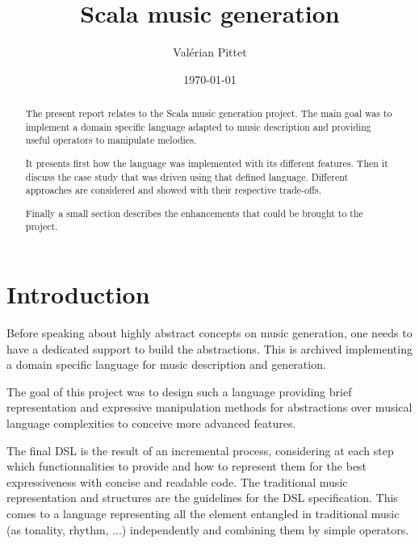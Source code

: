 \documentclass[twocolumn, 11pt]{article}
\begin{document}
\newcommand{\lln}[1]{
  \lstinline@#1@
}

\title{Scala music generation}
\author{Val\'erian Pittet}
\date{\today}

\onecolumn

\maketitle
\begin{abstract}

The present report relates to the Scala music generation project. The main goal was to implement a domain specific language adapted to music description and providing useful operators to manipulate melodies.

It presents first how the language was implemented with its different features.
Then it discuss the case study that was driven using that defined language. Different approaches are considered and showed with their respective trade-offs.

Finally a small section describes the enhancements that could be brought to the project.


\end{abstract}
\tableofcontents

\twocolumn
\section{Introduction}

Before speaking about highly abstract concepts on music generation, one needs to have a dedicated support to build the abstractions.
This is archived implementing a domain specific language for music description and generation.

The goal of this project was to design such a language providing brief representation and expressive manipulation methods
for abstractions over musical language complexities to conceive more advanced features.

The final DSL is the result of an incremental process, considering at each step which functionnalities to provide and how to represent them for the best expressiveness with concise and readable code.
The traditional music representation and structures are the guidelines for the DSL specification. This comes to a language representing all the element entangled in traditional music (as tonality, rhythm, ...) independently and combining them by simple operators.

\end{document}
